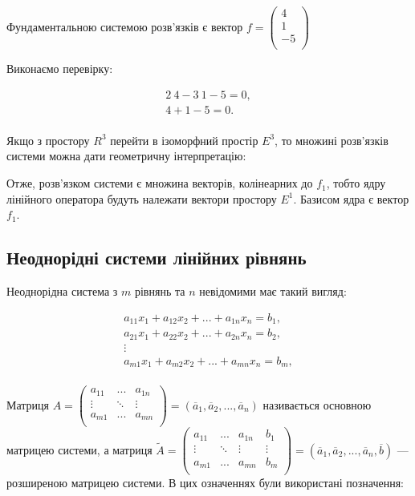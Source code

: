 Фундаментальною системою розв’язків є вектор $f = \begin{pmatrix}
	4  \\
	1  \\
	-5 \\
\end{pmatrix}$



Виконаємо перевірку:

$$\begin{matrix}
	2 ~ 4 - 3 ~ 1 - 5 = 0, \\
	4 + 1 - 5 = 0. \\
\end{matrix}$$

Якщо з простору $R^3$ перейти в ізоморфний простір $E^3$, то множині розв’язків
системи можна дати геометричну інтерпретацію:

\parbox{8cm}{}


Отже, розв’язком системи є множина векторів, колінеарних до $f_1$, тобто ядру
лінійного оператора будуть належати вектори простору $E^1$. Базисом ядра є вектор $f_1$.

\subsection{Неоднорідні системи лінійних рівнянь}

Неоднорідна система з $m$ рівнянь та $n$ невідомими має такий вигляд:

$$\begin{matrix}
	a_{11} x_1 + a_{12} x_2 + ... + a_{1n} x_n = b_1, \\
	a_{21} x_1 + a_{22} x_2 + ... + a_{2n} x_n = b_2, \\
	\vdots \\
	a_{m1} x_1 + a_{m2} x_2 + ... + a_{mn} x_n = b_m, \\
\end{matrix}$$


Матриця $A = \begin{pmatrix}
	a_{11} & ...    & a_{1n} \\
	\vdots & \ddots & \vdots \\
	a_{m1} & ...    & a_{mn} \\
\end{pmatrix} = (\overline{a}_1, \overline{a}_2, ..., \overline{a}_n)$ називається основною
матрицею системи, а матриця $\tilde{A} = \begin{pmatrix}
	a_{11} & ...    & a_{1n} & b_1    \\
	\vdots & \ddots & \vdots & \vdots \\
	a_{m1} & ...    & a_{mn} & b_m    \\
\end{pmatrix} = (\overline{a}_1, \overline{a}_2, ..., \overline{a}_n, \overline{b})$ ---
розширеною матрицею системи. В цих означеннях були використані позначення:

